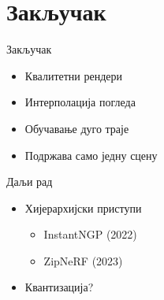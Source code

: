 \documentclass{beamer}
\begin{document}
	\section{Закључак}
		\begin{frame}{Закључак}
			\begin{itemize}
				\item Квалитетни рендери
				\item Интерполација погледа
				\item Обучавање дуго траје
				\item Подржава само једну сцену
			\end{itemize}
		\end{frame}
	
		\begin{frame}{Даљи рад}
			\begin{itemize}
				\item Хијерархијски приступи
				\begin{itemize}
					\item InstantNGP (2022)
					\item ZipNeRF (2023)
				\end{itemize}
				\item Квантизација?
			\end{itemize}
		\end{frame}
\end{document}
